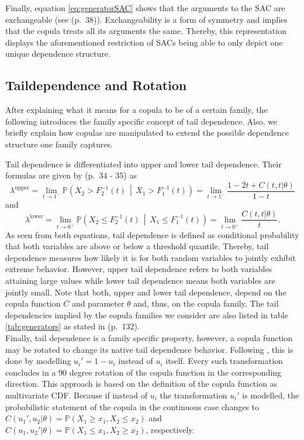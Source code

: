 \documentclass[
]{krantz}
\begin{document}
Finally, equation \eqref{eq:generatorSAC} shows that the arguments
to the SAC are exchangeable (see \citet{nelsen2006} (p.~38)).
Exchangeability is a form of symmetry and implies that the copula treats
all its arguments the same.
Thereby, this representation displays the aforementioned restriction of SACs being able to only depict one unique dependence structure.

\subsection{Taildependence and Rotation}\label{taildep}

After explaining what it means for a copula to be of a certain family,
the following introduces the family specific concept of tail dependence.
Also, we briefly explain how copulas are manipulated to extend the possible dependence structure one family
captures.

Tail dependence is differentiated into upper and lower tail dependence.
Their formulas are given by \citet{czado2019} (p.~34 - 35) as\\
\[
\lambda^{\text{upper}} = \lim_{t \to 1^{-}} \mathbb{P}\left( X_2 > F_2^{-1}(t) \,\middle|\, X_1 > F_1^{-1}(t) \right) = \lim_{t \to 1^{-}} \frac{1 - 2t + C(t, t|\theta)}{1 - t}
\label{eq:uppertaildep}
\]
and\\
\[
\lambda^{\text{lower}} = \lim_{t \to 0^{+}} \mathbb{P}\left( X_2 \leq F_2^{-1}(t) \,\middle|\, X_1 \leq F_1^{-1}(t) \right) 
= \lim_{t \to 0^{+}} \frac{C(t, t|\theta)}{t}.
\label{eq:lowertaildep}
\]
As seen from both equations, tail dependence is defined as conditional probability that both variables are above
or below a threshold quantile.
Thereby, tail dependence
measures how likely it is for both random variables to jointly exhibit extreme behavior.
However, upper tail dependence refers to both variables attaining large values while lower tail dependence means
both variables are jointly small.
Note that both, upper and lower tail dependence, depend on the copula function \(C\) and parameter \(\theta\) and, thus, on the copula
family. The tail dependencies implied by the copula families we consider are also listed in
table \ref{tab:generators} as stated in \citet{zhang2019} (p.~132).\\
Finally, tail dependence is a family specific property, however, a copula function may be rotated to
change its native tail dependence behavior.
Following \citet{pan2024}, this is done by modelling \(u_i' = 1 - u_i\) instead of \(u_i\) itself.
Every such transformation concludes in a \(90\) degree rotation of the copula function in the corresponding
direction. This approach is based on the definition of the copula function as multivariate CDF.
Because if instead of \(u_i\) the transformation \(u_i'\) is modelled,
the probabilistic statement of the copula in the continuous case changes to
\(C(u_1', u_2|\theta) =  \mathbb{P}(X_1 \geq x_1,X_2 \leq x_2)\) and
\(C(u_1, u_2'|\theta) =  \mathbb{P}(X_1 \leq x_1,X_2 \geq x_2)\), respectively.
\end{document}
